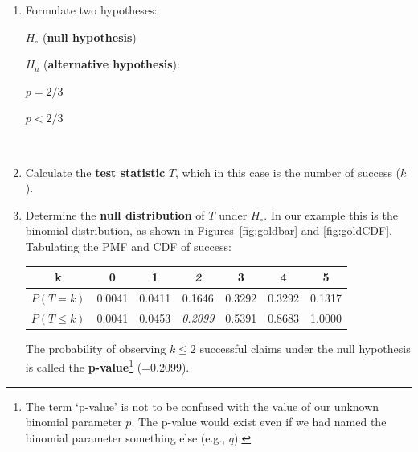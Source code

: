 \begin{enumerate}

\item Formulate two hypotheses:\\

\noindent\begin{minipage}{.4\textwidth}
  $H_\circ$ (\textbf{null hypothesis})
  
  \vspace{1em}
  
  $H_a$ (\textbf{alternative hypothesis}):
\end{minipage}
\begin{minipage}{.2\textwidth}
\end{minipage}
\begin{minipage}{.2\textwidth}
  $p={2/3}$
  
  \vspace{1em}
  
  $p<{2/3}$
\end{minipage}
\begin{minipage}{.2\textwidth}
\end{minipage}\\

\item Calculate the \textbf{test statistic} $T$, which in this case is
  the number of success ($k$).

\item Determine the \textbf{null distribution} of $T$ under
  $H_\circ$. In our example this is the binomial distribution, as
  shown in Figures~\ref{fig:goldbar} and \ref{fig:goldCDF}. Tabulating
  the PMF and CDF of success:

  \begin{center}
  \begin{tabular}{ccccccc}
    k & 0 & 1 & \textit{2} & 3 & 4 & 5 \\ \hline
    $P(T=k)$ & 0.0041 & 0.0411 & 0.1646 & 0.3292 & 0.3292 & 0.1317 \\
    $P({T}\leq{k})$ & 0.0041 & 0.0453 & \textit{0.2099} & 0.5391 & 0.8683 & 1.0000
  \end{tabular}
  \end{center}

  The probability of observing $k\leq{2}$ successful claims under the
  null hypothesis is called the \textbf{p-value}\footnote{The term
    `p-value' is not to be confused with the value of our unknown
    binomial parameter $p$. The p-value would exist even if we had
    named the binomial parameter something else (e.g., $q$).}
  (=0.2099).
  

\end{enumerate}
